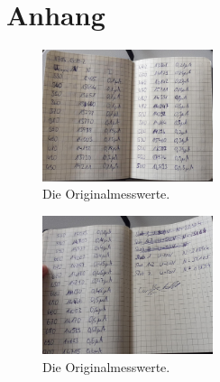 \section{Anhang}
\label{sec:anhang}
\begin{figure}[h]
    \centering
    \includegraphics[width = 5cm]{content/mess1.jpg}
    \caption{Die Originalmesswerte.}
    \label{fig:mess1}
  \end{figure}

  \begin{figure}[h]
    \centering
    \includegraphics[width = 5cm]{content/mess2.jpg}
    \caption{Die Originalmesswerte.}
    \label{fig:mess2}
  \end{figure}